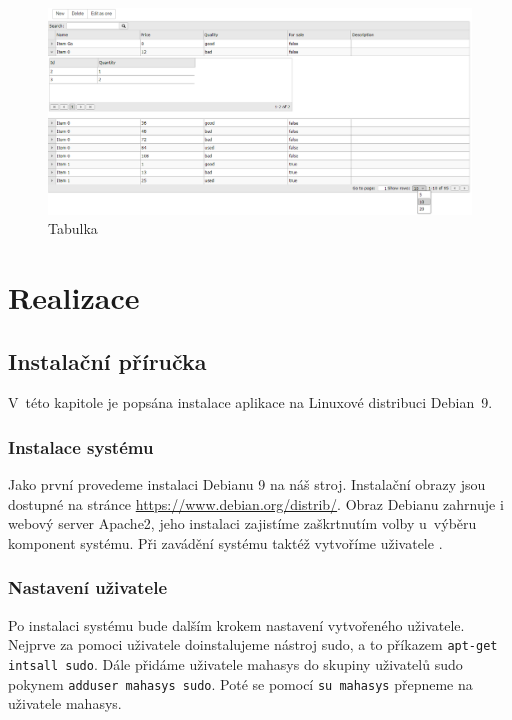 \documentclass[thesis=B,czech]{FITthesis}[2012/06/26]
\begin{document}
\begin{figure}
	\includegraphics[width=500pt, height=0.8\textwidth, angle=90]{data_table.png}
	\caption{Tabulka}\label{tabulka}
\end{figure}
	

\chapter{Realizace}

\section{Instalační příručka}
	V~této kapitole je popsána instalace aplikace na Linuxové distribuci Debian~9.
\subsection{Instalace systému}
	Jako první provedeme instalaci Debianu 9 na náš stroj. Instalační obrazy jsou dostupné na stránce \url{https://www.debian.org/distrib/}. Obraz Debianu zahrnuje i webový server Apache2, jeho instalaci zajistíme zaškrtnutím volby  u~výběru komponent systému. Při zavádění systému taktéž vytvoříme uživatele .
\subsection{Nastavení uživatele}
	Po instalaci systému bude dalším krokem nastavení vytvořeného uživatele. Nejprve za pomoci uživatele  doinstalujeme nástroj sudo, a to příkazem \verb|apt-get intsall sudo|. Dále přidáme uživatele mahasys do skupiny uživatelů sudo pokynem \verb|adduser mahasys sudo|. Poté se pomocí \verb|su mahasys| přepneme na uživatele mahasys.
\end{document}
